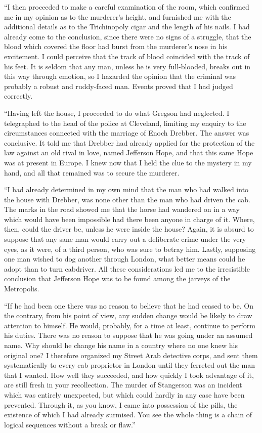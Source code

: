 \documentclass[12pt]{book}
\begin{document}
“I then proceeded to make a careful examination of the room, which confirmed me in my opinion as to the murderer’s height, and furnished me with the additional details as to the Trichinopoly cigar and the length of his nails. I had already come to the conclusion, since there were no signs of a struggle, that the blood which covered the floor had burst from the murderer’s nose in his excitement. I could perceive that the track of blood coincided with the track of his feet. It is seldom that any man, unless he is very full-blooded, breaks out in this way through emotion, so I hazarded the opinion that the criminal was probably a robust and ruddy-faced man. Events proved that I had judged correctly. 

“Having left the house, I proceeded to do what Gregson had neglected. I telegraphed to the head of the police at Cleveland, limiting my enquiry to the circumstances connected with the marriage of Enoch Drebber. The answer was conclusive. It told me that Drebber had already applied for the protection of the law against an old rival in love, named Jefferson Hope, and that this same Hope was at present in Europe. I knew now that I held the clue to the mystery in my hand, and all that remained was to secure the murderer. 

“I had already determined in my own mind that the man who had walked into the house with Drebber, was none other than the man who had driven the cab. The marks in the road showed me that the horse had wandered on in a way which would have been impossible had there been anyone in charge of it. Where, then, could the driver be, unless he were inside the house? Again, it is absurd to suppose that any sane man would carry out a deliberate crime under the very eyes, as it were, of a third person, who was sure to betray him. Lastly, supposing one man wished to dog another through London, what better means could he adopt than to turn cabdriver. All these considerations led me to the irresistible conclusion that Jefferson Hope was to be found among the jarveys of the Metropolis. 

“If he had been one there was no reason to believe that he had ceased to be. On the contrary, from his point of view, any sudden change would be likely to draw attention to himself. He would, probably, for a time at least, continue to perform his duties. There was no reason to suppose that he was going under an assumed name. Why should he change his name in a country where no one knew his original one? I therefore organized my Street Arab detective corps, and sent them systematically to every cab proprietor in London until they ferreted out the man that I wanted. How well they succeeded, and how quickly I took advantage of it, are still fresh in your recollection. The murder of Stangerson was an incident which was entirely unexpected, but which could hardly in any case have been prevented. Through it, as you know, I came into possession of the pills, the existence of which I had already surmised. You see the whole thing is a chain of logical sequences without a break or flaw.” 
\end{document}
